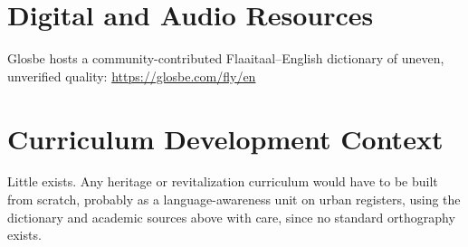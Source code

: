 \documentclass[12pt]{article}
\begin{document}
\section{Digital and Audio Resources}
Glosbe hosts a community-contributed Flaaitaal--English dictionary of uneven, unverified quality: \url{https://glosbe.com/fly/en}

\section{Curriculum Development Context}
Little exists. Any heritage or revitalization curriculum would have to be built from scratch, probably as a language-awareness unit on urban registers, using the dictionary and academic sources above with care, since no standard orthography exists.
\end{document}
